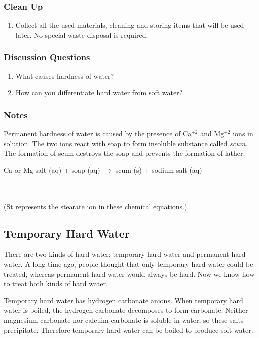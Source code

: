 \subsubsection*{Clean Up}
\begin{enumerate}
\item{Collect all the used materials, cleaning and storing items that will be used later. No special waste disposal is required.}
\end{enumerate}

\subsubsection*{Discussion Questions}
\begin{enumerate}
\item{What causes hardness of water?}
\item{How can you differentiate hard water from soft water?}
\end{enumerate}

\subsubsection*{Notes}
Permanent hardness of water is caused by the presence of Ca$^{+2}$ and Mg$^{+2}$ ions in solution. The two ions react with soap to form insoluble substance called \textit{scum}. The formation of scum destroys the soap and prevents the formation of lather. 
\begin{center}
Ca or Mg salt (aq) + soap (aq)  $\longrightarrow$ scum (s) + sodium salt (aq)\\
\\
\\
\end{center}
(St represents the stearate ion  in these chemical equations.)

\subsection{Temporary Hard Water}

There are two kinds of hard water: temporary hard water and permanent hard water. A long time ago, people thought that only temporary hard water could be treated, whereas permanent hard water would always be hard. Now we know how to treat both kinds of hard water.

Temporary hard water has hydrogen carbonate anions. When temporary hard water is boiled, the hydrogen carbonate decomposes to form carbonate. Neither magnesium carbonate nor calcuim carbonate is soluble in water, so these salts precipitate. Therefore temporary hard water can be boiled to produce soft water.

